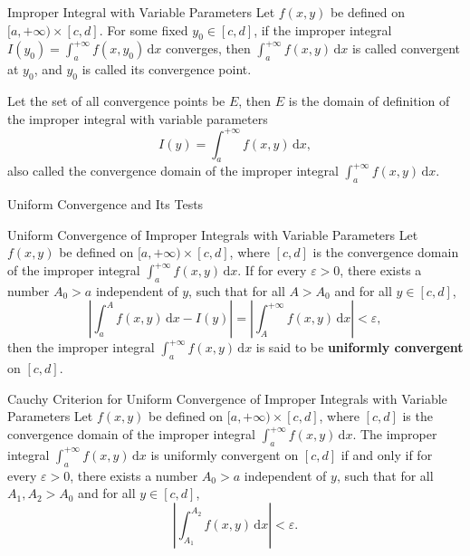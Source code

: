 \documentclass[11pt]{../../TexTemplate/elegantbook}
\begin{document}
\begin{definition}{Improper Integral with Variable Parameters}
    Let \(f(x, y)\) be defined on \([a, +\infty) \times [c, d]\).
    For some fixed \(y_{0} \in [c, d]\), if the improper integral
    \(
    I(y_{0}) = \int_{a}^{+\infty} f(x, y_{0}) \, \mathrm{d}x
    \)
    converges, then \(\int_{a}^{+\infty} f(x, y) \, \mathrm{d}x\) is called convergent at \(y_{0}\),
    and \(y_{0}\) is called its convergence point.
    
    Let the set of all convergence points be \(E\),
    then \(E\) is the domain of definition of the improper integral with variable parameters
    \[
    I(y) = \int_{a}^{+\infty} f(x, y) \, \mathrm{d}x,
    \]
    also called the convergence domain of the improper integral \(\int_{a}^{+\infty} f(x, y) \, \mathrm{d}x\).
\end{definition}

\begin{leftbarTitle}{Uniform Convergence and Its Tests}\end{leftbarTitle}
\begin{definition}{Uniform Convergence of Improper Integrals with Variable Parameters}
    Let \(f(x, y)\) be defined on \([a, +\infty) \times [c, d]\),
    where \([c, d]\) is the convergence domain of the improper integral
    \(\int_{a}^{+\infty} f(x, y) \, \mathrm{d}x\).
    If for every \(\varepsilon > 0\), there exists a number \(A_{0} > a\) independent of \(y\),
    such that for all \(A > A_{0}\) and for all \(y \in [c, d]\),
    \[
    \left| \int_{a}^{A} f(x, y) \, \mathrm{d}x - I(y) \right| = \left| \int_{A}^{+\infty} f(x, y) \, \mathrm{d}x \right| < \varepsilon,
    \]
    then the improper integral \(\int_{a}^{+\infty} f(x, y) \, \mathrm{d}x\)
    is said to be \textbf{uniformly convergent} on \([c, d]\).
\end{definition}

\begin{theorem}{Cauchy Criterion for Uniform Convergence of Improper Integrals with Variable Parameters}
    Let \(f(x, y)\) be defined on \([a, +\infty) \times [c, d]\),
    where \([c, d]\) is the convergence domain of the improper integral
    \(\int_{a}^{+\infty} f(x, y) \, \mathrm{d}x\).
    The improper integral \(\int_{a}^{+\infty} f(x, y) \, \mathrm{d}x\)
    is uniformly convergent on \([c, d]\) if and only if
    for every \(\varepsilon > 0\), there exists a number \(A_{0} > a\) independent of \(y\),
    such that for all \(A_{1}, A_{2} > A_{0}\) and for all \(y \in [c, d]\),
    \[
    \left| \int_{A_{1}}^{A_{2}} f(x, y) \, \mathrm{d}x \right| < \varepsilon.
    \]
\end{theorem}
\end{document}
